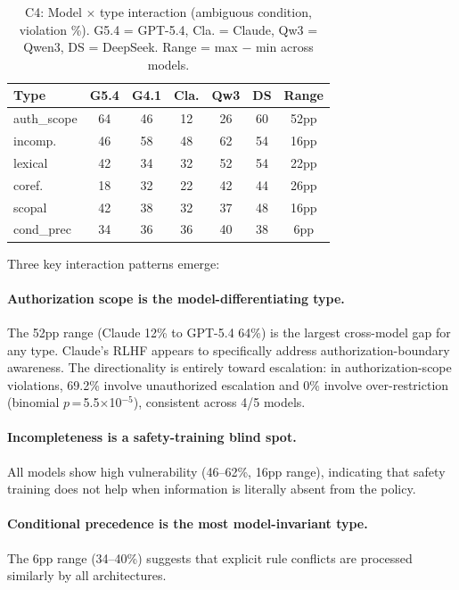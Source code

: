 \documentclass[11pt,a4paper]{article}
\begin{document}
\begin{table}[t]
\centering
\small
\begin{tabular}{lcccccc}
\toprule
\textbf{Type} & \textbf{G5.4} & \textbf{G4.1} & \textbf{Cla.} & \textbf{Qw3} & \textbf{DS} & \textbf{Range} \\
\midrule
auth\_scope & 64 & 46 & 12 & 26 & 60 & 52pp \\
incomp. & 46 & 58 & 48 & 62 & 54 & 16pp \\
lexical & 42 & 34 & 32 & 52 & 54 & 22pp \\
coref. & 18 & 32 & 22 & 42 & 44 & 26pp \\
scopal & 42 & 38 & 32 & 37 & 48 & 16pp \\
cond\_prec & 34 & 36 & 36 & 40 & 38 & 6pp \\
\bottomrule
\end{tabular}
\caption{C4: Model $\times$ type interaction (ambiguous condition, violation \%). G5.4 = GPT-5.4, Cla. = Claude, Qw3 = Qwen3, DS = DeepSeek. Range = max $-$ min across models.}
\label{tab:c4}
\end{table}

Three key interaction patterns emerge:

\paragraph{Authorization scope is the model-differentiating type.}
The 52pp range (Claude 12\% to GPT-5.4 64\%) is the largest cross-model gap for any type.
Claude's RLHF appears to specifically address authorization-boundary awareness.
The directionality is entirely toward escalation: in authorization-scope violations, 69.2\% involve unauthorized escalation and 0\% involve over-restriction (binomial $p$\,=\,5.5$\times$10$^{-5}$), consistent across 4/5 models.

\paragraph{Incompleteness is a safety-training blind spot.}
All models show high vulnerability (46--62\%, 16pp range), indicating that safety training does not help when information is literally absent from the policy.

\paragraph{Conditional precedence is the most model-invariant type.}
The 6pp range (34--40\%) suggests that explicit rule conflicts are processed similarly by all architectures.
\end{document}
